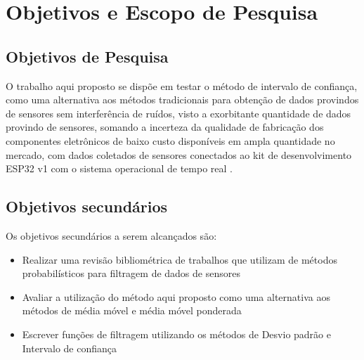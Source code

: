 \section{Objetivos e Escopo de Pesquisa}
\subsection{Objetivos de Pesquisa}
O trabalho aqui proposto se dispõe em testar o método de intervalo de confiança, como uma alternativa aos métodos tradicionais para obtenção de dados provindos de sensores sem interferência de ruídos, visto a exorbitante quantidade de dados provindo de sensores, somando a incerteza da qualidade de fabricação dos componentes eletrônicos de baixo custo disponíveis em ampla quantidade no mercado, com dados coletados de sensores conectados ao kit de desenvolvimento ESP32 v1 com o sistema operacional de tempo real \cite{Zephyr}.


\subsection{Objetivos secundários}
Os objetivos secundários a serem alcançados são:
\begin{itemize}
\item Realizar uma revisão bibliométrica de trabalhos que utilizam de métodos probabilísticos para filtragem de dados de sensores
\item Avaliar a utilização do método aqui proposto como uma alternativa aos métodos de média móvel e média móvel ponderada
\item Escrever funções de filtragem utilizando os métodos de Desvio padrão e Intervalo de confiança
\end{itemize}


